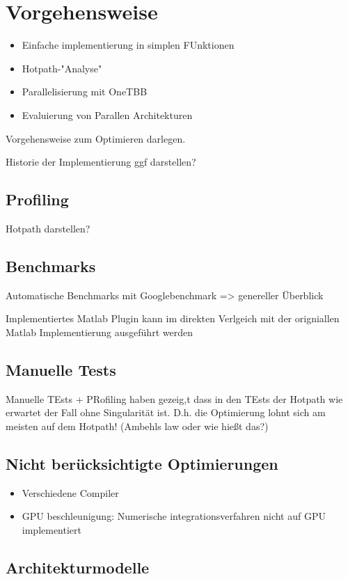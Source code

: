 \chapter{Vorgehensweise}


\begin{itemize}
    \item Einfache implementierung in simplen FUnktionen
    \item Hotpath-"Analyse"
    \item Parallelisierung mit OneTBB
    \item Evaluierung von Parallen Architekturen
\end{itemize}

Vorgehensweise zum Optimieren darlegen.

Historie der Implementierung ggf darstellen?

\section{Profiling}

Hotpath darstellen?


\section{Benchmarks}

Automatische Benchmarks mit Googlebenchmark => genereller Überblick

Implementiertes Matlab Plugin kann im direkten Verlgeich mit der origniallen Matlab Implementierung ausgeführt werden


\section{Manuelle Tests}

Manuelle TEsts + PRofiling haben gezeig,t dass in den TEsts der Hotpath wie erwartet der Fall ohne Singularität ist.
D.h. die Optimierung lohnt sich am meisten auf dem Hotpath! (Ambehls law oder wie hießt das?)

\section{Nicht berücksichtigte Optimierungen}

\begin{itemize}
    \item Verschiedene Compiler
    \item GPU beschleunigung: Numerische integrationsverfahren nicht auf GPU implementiert
\end{itemize}

\section{Architekturmodelle}

